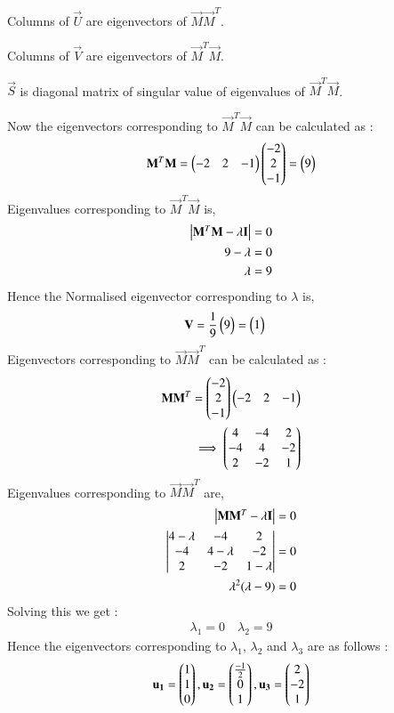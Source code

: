 \documentclass[journal,12pt,twocolumn]{IEEEtran}
\begin{document}
Columns of $\vec{U}$ are eigenvectors of $\vec{M}\vec{M}^T$.


Columns of $\vec{V}$ are eigenvectors of $\vec{M}^T\vec{M}$.


$\vec{S}$ is diagonal matrix of singular value of eigenvalues of $\vec{M}^T\vec{M}$.


Now the eigenvectors corresponding to $\vec{M}^T\vec{M}$ can be calculated as : 
\begin{align}
\mathbf{M}^T\mathbf{M} =  \begin{pmatrix}-2&2&-1\end{pmatrix}\begin{pmatrix}-2\\2\\-1\end{pmatrix} = \begin{pmatrix}9\end{pmatrix}
\end{align}
Eigenvalues corresponding to $\vec{M}^T\vec{M}$  is,
\begin{align}
\begin{vmatrix}\mathbf{M}^T\mathbf{M}-\lambda\mathbf{I}\end{vmatrix} &= 0\\
9-\lambda&= 0\\
\lambda &= 9\label{eq:lambda2}
\end{align} 
Hence the Normalised eigenvector corresponding to $\lambda$ is,
\begin{align}
\mathbf{V}&=\frac{1}{9}\begin{pmatrix}9\end{pmatrix}=\begin{pmatrix}1\end{pmatrix}
\end{align}
Eigenvectors corresponding to $\vec{M}\vec{M}^T$ can be calculated as : 
\begin{align}
\mathbf{MM}^T = \begin{pmatrix}-2\\2\\-1\end{pmatrix}\begin{pmatrix}-2&2&-1\end{pmatrix} \\\implies \begin{pmatrix}4&-4&2\\-4&4&-2\\2&-2&1\end{pmatrix}
\end{align}
Eigenvalues corresponding to $\vec{M}\vec{M}^T$  are,
\begin{align}
\begin{vmatrix}\mathbf{M}\mathbf{M}^T-\lambda\mathbf{I}\end{vmatrix} &= 0\\
\begin{vmatrix}4-\lambda&-4&2\\-4&4-\lambda&-2\\2&-2&1-\lambda\end{vmatrix}&=0\\
\lambda^2(\lambda-9)&=0
\end{align} 
Solving this we get : 
\begin{align}
    \lambda_1=0 \quad \lambda_2=9
\end{align}
Hence the eigenvectors corresponding to $\lambda_1$, $\lambda_2$ and  $\lambda_3$ are as follows :
\begin{align}
\mathbf{u_1} =\begin{pmatrix}1\\1\\0\end{pmatrix},
\mathbf{u_2} =\begin{pmatrix}\frac{-1}{2}\\0\\1\end{pmatrix},
\mathbf{u_3} = \begin{pmatrix}2\\-2\\1\end{pmatrix}
\end{align}
\end{document}
